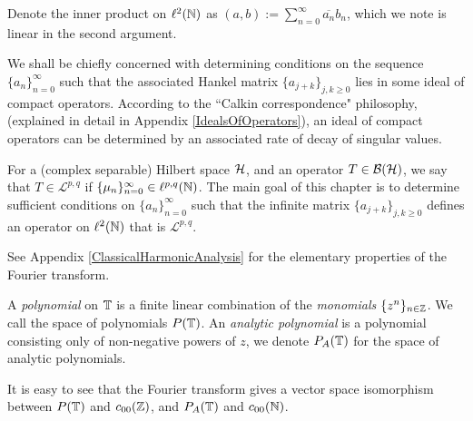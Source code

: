 Denote the inner product on $\ell^2(\mathbb{N})$ 
as $(a,b) := \sum_{n=0}^\infty \overline{a_n}b_n$, which we note
is linear in the second argument.

We shall be chiefly concerned with determining conditions on the sequence $\{a_n\}_{n=0}^\infty$
such that the associated Hankel matrix $\{a_{j+k}\}_{j,k\geq 0}$ lies in some ideal
of compact operators. According to the ``Calkin correspondence" philosophy, (explained
in detail in Appendix \ref{IdealsOfOperators}), an ideal of compact operators
can be determined by an associated rate of decay of singular values.

For a (complex separable) Hilbert space $\mathcal{H}$, and an operator $T \in \mathcal{B}(\mathcal{H})$, 
we say that $T \in \mathcal{L}^{p,q}$ if $\{\mu_n\}_{n=0}^\infty \in \ell^{p,q}(\mathbb{N})$.
The main goal of this chapter is to determine sufficient conditions on $\{a_n\}_{n=0}^\infty$
such that the infinite matrix $\{a_{j+k}\}_{j,k\geq 0}$ defines an operator
on $\ell^2(\mathbb{N})$ that is $\mathcal{L}^{p,q}$.


See Appendix \ref{ClassicalHarmonicAnalysis} for the elementary properties of the Fourier transform. 

A \emph{polynomial} on $\mathbb{T}$ is a finite linear combination of the \emph{monomials}
$\{z^n\}_{n \in \mathbb{Z}}$. We call the space of polynomials $P(\mathbb{T})$.
An \emph{analytic polynomial} is a polynomial consisting only of non-negative powers
of $z$, we denote $P_A(\mathbb{T})$ for the space of analytic polynomials. 

It is easy to see that the Fourier transform gives a vector space isomorphism between $P(\mathbb{T})$
and $c_{00}(\mathbb{Z})$, and $P_A(\mathbb{T})$ and $c_{00}(\mathbb{N})$.

